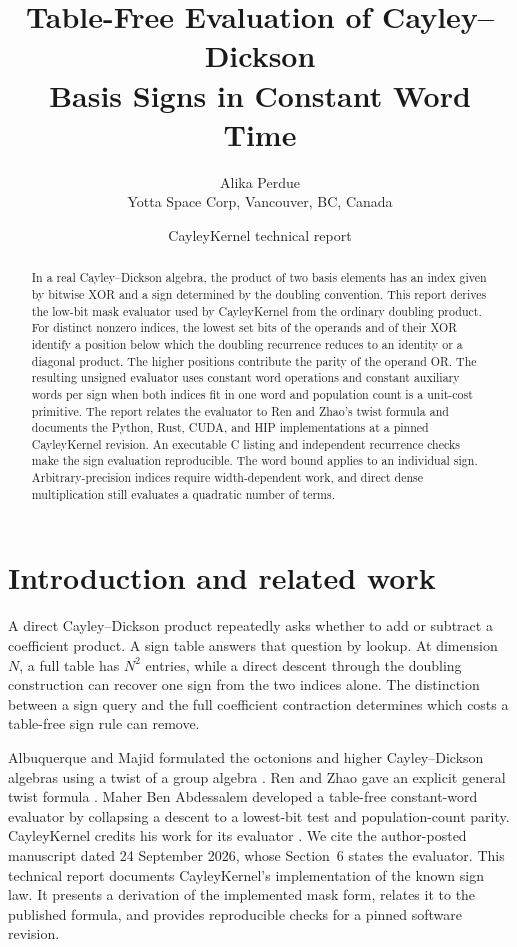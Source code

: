 \documentclass[11pt]{article}
\title{Table-Free Evaluation of Cayley--Dickson\\Basis Signs in Constant Word Time}
\author{Alika Perdue\\[.25em]\small Yotta Space Corp, Vancouver, BC, Canada}
\date{CayleyKernel technical report}
\begin{document}
\maketitle

\begin{abstract}
In a real Cayley--Dickson algebra, the product of two basis elements has an
index given by bitwise XOR and a sign determined by the doubling convention.
This report derives the low-bit mask evaluator used by CayleyKernel from the
ordinary doubling product. For distinct nonzero indices, the lowest set bits of the
operands and of their XOR identify a position below which the doubling
recurrence reduces to an identity or a diagonal product. The higher positions
contribute the parity of the operand OR. The resulting unsigned evaluator
uses constant word operations and constant auxiliary words per sign when both
indices fit in one word and population count is a unit-cost primitive.
The report relates the evaluator to Ren and Zhao's twist formula and
documents the Python, Rust, CUDA, and HIP implementations at a pinned
CayleyKernel revision. An executable C listing and independent recurrence
checks make the sign evaluation reproducible. The word bound applies to an
individual sign. Arbitrary-precision indices require width-dependent work,
and direct dense multiplication still evaluates a quadratic number of terms.
\end{abstract}

\section{Introduction and related work}
A direct Cayley--Dickson product repeatedly asks whether to add or subtract a
coefficient product. A sign table answers that question by lookup. At
dimension \(N\), a full table has \(N^2\) entries, while a direct descent
through the doubling construction can recover one sign from the two indices
alone. The distinction between a sign query and the full coefficient
contraction determines which costs a table-free sign rule can remove.

Albuquerque and Majid formulated the octonions and higher Cayley--Dickson
algebras using a twist of a group algebra \cite{albuquerque}. Ren and Zhao
gave an explicit general twist formula \cite{ren,renv2}. Maher Ben Abdessalem
developed a table-free constant-word evaluator by collapsing a descent to a
lowest-bit test and population-count parity. CayleyKernel credits his work
for its evaluator \cite{abdessalem,cayley}. We cite the author-posted
manuscript dated 24 September 2026, whose Section~6 states the evaluator.
This technical report documents CayleyKernel's implementation of the known
sign law. It presents a derivation of the implemented mask form, relates it
to the published formula, and provides reproducible checks for a pinned
software revision.
\end{document}
